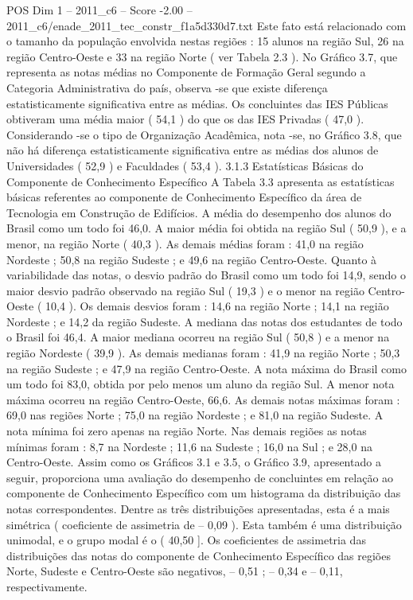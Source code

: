 \begin{textsample}{POS Dim 1 – 2011\_c6 – Score -2.00 – 2011\_c6/enade\_2011\_tec\_constr\_f1a5d330d7.txt}
Este fato está relacionado com o tamanho da população envolvida nestas regiões : 15 alunos na região Sul, 26 na região Centro-Oeste e 33 na região Norte ( ver Tabela 2.3 ).
No Gráfico 3.7, que representa as notas médias no Componente de Formação Geral segundo a Categoria Administrativa do país, observa -se que existe diferença estatisticamente significativa entre as médias.
Os concluintes das IES Públicas obtiveram uma média maior ( 54,1 ) do que os das IES Privadas ( 47,0 ).
Considerando -se o tipo de Organização Acadêmica, nota -se, no Gráfico 3.8, que não há diferença estatisticamente significativa entre as médias dos alunos de Universidades ( 52,9 ) e Faculdades ( 53,4 ). 3.1.3 Estatísticas Básicas do Componente de Conhecimento Específico A Tabela 3.3 apresenta as estatísticas básicas referentes ao componente de Conhecimento Específico da área de Tecnologia em Construção de Edifícios.
A média do desempenho dos alunos do Brasil como um todo foi 46,0.
A maior média foi obtida na região Sul ( 50,9 ), e a menor, na região Norte ( 40,3 ).
As demais médias foram : 41,0 na região Nordeste ; 50,8 na região Sudeste ; e 49,6 na região Centro-Oeste.
Quanto à variabilidade das notas, o desvio padrão do Brasil como um todo foi 14,9, sendo o maior desvio padrão observado na região Sul ( 19,3 ) e o menor na região Centro-Oeste ( 10,4 ).
Os demais desvios foram : 14,6 na região Norte ; 14,1 na região Nordeste ; e 14,2 da região Sudeste.
A mediana das notas dos estudantes de todo o Brasil foi 46,4.
A maior mediana ocorreu na região Sul ( 50,8 ) e a menor na região Nordeste ( 39,9 ).
As demais medianas foram : 41,9 na região Norte ; 50,3 na região Sudeste ; e 47,9 na região Centro-Oeste.
A nota máxima do Brasil como um todo foi 83,0, obtida por pelo menos um aluno da região Sul.
A menor nota máxima ocorreu na região Centro-Oeste, 66,6.
As demais notas máximas foram : 69,0 nas regiões Norte ; 75,0 na região Nordeste ; e 81,0 na região Sudeste.
A nota mínima foi zero apenas na região Norte.
Nas demais regiões as notas mínimas foram : 8,7 na Nordeste ; 11,6 na Sudeste ; 16,0 na Sul ; e 28,0 na Centro-Oeste.
Assim como os Gráficos 3.1 e 3.5, o Gráfico 3.9, apresentado a seguir, proporciona uma avaliação do desempenho de concluintes em relação ao componente de Conhecimento Específico com um histograma da distribuição das notas correspondentes.
Dentre as três distribuições apresentadas, esta é a mais simétrica ( coeficiente de assimetria de – 0,09 ).
Esta também é uma distribuição unimodal, e o grupo modal é o ( 40,50 ].
Os coeficientes de assimetria das distribuições das notas do componente de Conhecimento Específico das regiões Norte, Sudeste e Centro-Oeste são negativos, – 0,51 ; – 0,34 e – 0,11, respectivamente.

\end{textsample}
